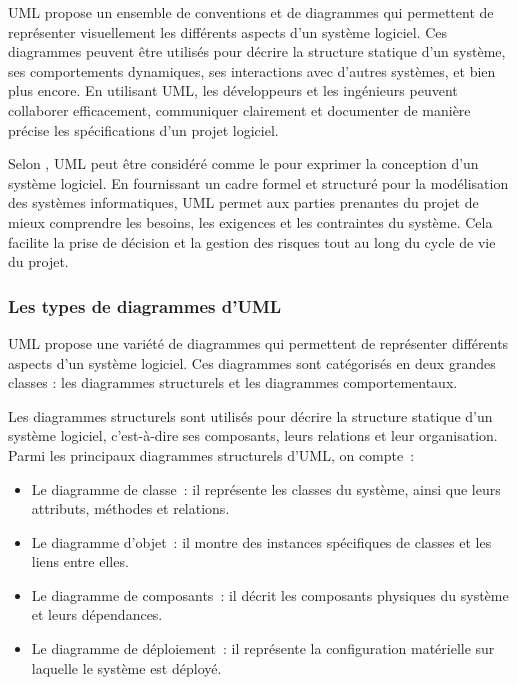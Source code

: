 UML propose un ensemble de conventions et de diagrammes qui permettent de
représenter visuellement les différents aspects d’un système logiciel. Ces
diagrammes peuvent être utilisés pour décrire la structure statique d’un système,
ses comportements dynamiques, ses interactions avec d’autres systèmes, et bien
plus encore. En utilisant UML, les développeurs et les ingénieurs peuvent
collaborer efficacement, communiquer clairement et documenter de manière précise
les spécifications d’un projet logiciel.

Selon \textcite{fowler2003uml}, UML peut être considéré comme le
 pour exprimer la conception d’un système
logiciel. En fournissant un cadre formel et structuré pour la modélisation des
systèmes informatiques, UML permet aux parties prenantes du projet de mieux
comprendre les besoins, les exigences et les contraintes du système. Cela facilite
la prise de décision et la gestion des risques tout au long du cycle de vie du projet.

\subsubsection{Les types de diagrammes d'UML}
UML propose une variété de diagrammes qui permettent de représenter différents
aspects d'un système logiciel. Ces diagrammes sont catégorisés en deux grandes
classes : les diagrammes structurels et les diagrammes comportementaux.

Les diagrammes structurels sont utilisés pour décrire la structure statique
d’un système logiciel, c’est-à-dire ses composants, leurs relations et leur
organisation. Parmi les principaux diagrammes structurels d’UML, on compte :

\begin{itemize}

  \item Le diagramme de classe : il représente les classes du système, ainsi que leurs
    attributs, méthodes et relations.

  \item Le diagramme d’objet : il montre des instances spécifiques de classes
    et les liens entre elles.

  \item Le diagramme de composants : il décrit les composants physiques du
    système et leurs dépendances.

  \item Le diagramme de déploiement : il représente la configuration matérielle
    sur laquelle le système est déployé.

\end{itemize}


